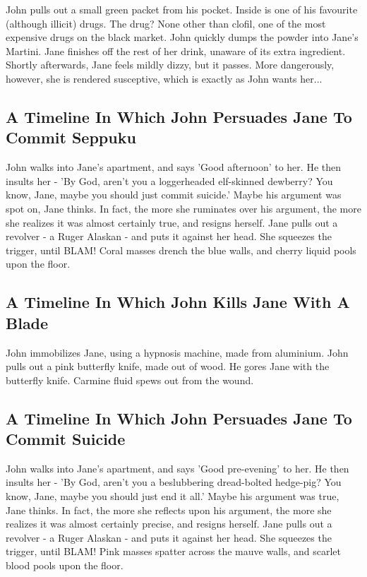 \documentclass{article}
\begin{document}
John pulls out a small green packet from his pocket. Inside is one of his favourite (although illicit) drugs.
The drug? None other than clofil, one of the most expensive drugs on the black market.
John quickly dumps the powder into Jane's Martini.
Jane finishes off the rest of her drink, unaware of its extra ingredient.
Shortly afterwards, Jane feels mildly dizzy, but it passes.
More dangerously, however, she is rendered susceptive, which is exactly as John wants her...
\subsection{A Timeline In Which John Persuades Jane To Commit Seppuku}


John walks into Jane's apartment, and says 'Good afternoon' to her.
He then insults her {-} 'By God, aren't you a loggerheaded elf{-}skinned dewberry?
You know, Jane, maybe you should just commit suicide.'
Maybe his argument was spot on, Jane thinks.
In fact, the more she ruminates over his argument, the more she realizes it was almost certainly true, and resigns herself.
Jane pulls out a revolver {-} a Ruger Alaskan {-} and puts it against her head.
She squeezes the trigger, until BLAM!
Coral masses drench the blue walls, and cherry liquid pools upon the floor.
\subsection{A Timeline In Which John Kills Jane With A Blade}


John immobilizes Jane, using a hypnosis machine, made from aluminium.
John pulls out a pink butterfly knife, made out of wood.
He gores Jane with the butterfly knife.
Carmine fluid spews out from the wound.
\subsection{A Timeline In Which John Persuades Jane To Commit Suicide}


John walks into Jane's apartment, and says 'Good pre{-}evening' to her.
He then insults her {-} 'By God, aren't you a beslubbering dread{-}bolted hedge{-}pig?
You know, Jane, maybe you should just end it all.'
Maybe his argument was true, Jane thinks.
In fact, the more she reflects upon his argument, the more she realizes it was almost certainly precise, and resigns herself.
Jane pulls out a revolver {-} a Ruger Alaskan {-} and puts it against her head.
She squeezes the trigger, until BLAM!
Pink masses spatter across the mauve walls, and scarlet blood pools upon the floor.
\end{document}
